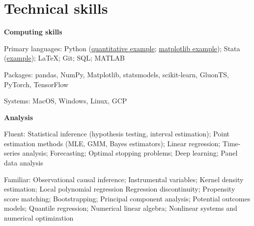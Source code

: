 \documentclass[10pt]{article}
\newcommand{\mysep}{\vspace{4pt}}
\begin{document}
\mysep{}
\section*{Technical skills}

\textbf{Computing skills}
\begin{blist}
\item Primary languages:
Python
(\href{https://github.com/tara-sullivan/hcs/blob/master/hcs/model/afmodel.py}{quantitative example}; 
\href{https://github.com/tara-sullivan/hcs/blob/master/hcs/img/code/plot_line_labels.py}{matplotlib example});
Stata (\href{https://github.com/tara-sullivan/hcs/blob/master/hcs/data/ipeds/c/clean_data/ipeds_c_clean.do}{example}); 
\LaTeX; Git; SQL; MATLAB

\item Packages:
pandas, NumPy, Matplotlib, statsmodels, scikit-learn, GluonTS, PyTorch, TensorFlow
\item Systems: MacOS, Windows, Linux, GCP
\end{blist}

\mysep{}
\textbf{Analysis}
\begin{blist}
\item Fluent:
Statistical inference (hypothesis testing, interval estimation);
Point estimation methods (MLE, GMM, Bayes estimators);
Linear regression;
Time-series analysis;
Forecasting;
Optimal stopping problems;
Deep learning;
Panel data analysis

\item Familiar: 
Observational causal inference;
Instrumental variables;
Kernel density estimation;
Local polynomial regression
Regression discontinuity;
Propensity score matching; 
Bootstrapping;
Principal component analysis;
Potential outcomes models;
Quantile regression;
Numerical linear algebra;
Nonlinear systems and numerical optimization 
\end{blist}
\end{document}
